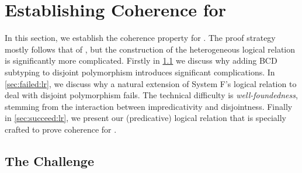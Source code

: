 
\section{Establishing Coherence for \fnamee}
\label{sec:coherence:poly}

In this section, we establish the coherence property for \fnamee. The proof
strategy mostly follows that of \namee, but the construction of the
heterogeneous logical relation is significantly more complicated. Firstly in
\cref{sec:para:intuition} we discuss why adding BCD subtyping to disjoint
polymorphism introduces significant complications. In
\cref{sec:failed:lr}, we discuss why a natural extension of
System F's logical relation to deal with disjoint polymorphism fails. The technical
difficulty is \emph{well-foundedness}, stemming from the interaction between
impredicativity and disjointness. Finally in \cref{sec:succeed:lr}, we present
our (predicative) logical relation that is specially crafted to prove coherence
for \fnamee.

\subsection{The Challenge}
\label{sec:para:intuition}

